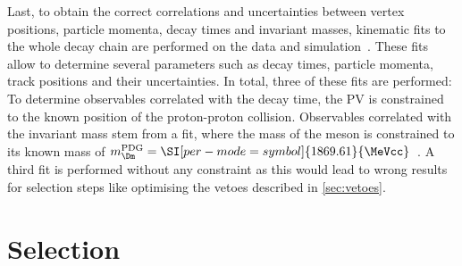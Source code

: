 Last, to obtain the correct correlations and uncertainties between vertex positions, particle momenta, decay times and invariant masses, kinematic fits to the whole decay chain are performed on the data and simulation~\cite{2005NIMPA}.
These fits allow to determine several parameters such as decay times, particle momenta, track positions and their uncertainties.
In total, three of these fits are performed: To determine observables correlated with the decay time, the \ac{PV} is constrained to the known position of the proton-proton collision.
Observables correlated with the invariant mass stem from a fit, where the mass of the \Dm meson is constrained to its known mass of $m_\Dm^{\text{PDG}}=\SI[per-mode=symbol]{1869.61}{\MeVcc}$~\cite{PDG2018}.
A third fit is performed without any constraint as this would lead to wrong results for selection steps like optimising the vetoes described in \cref{sec:vetoes}.

\section{Selection}
\label{sec:selection}

